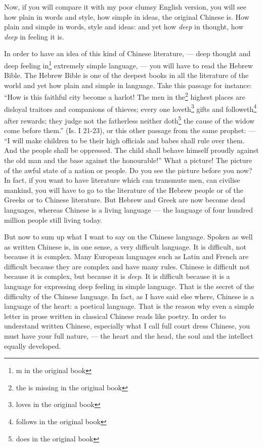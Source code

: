 Now, if you will compare it with my poor clumsy English version, you will see how plain in words and style, how simple in ideas, the original Chinese is.
How plain and simple in words, style and ideas: and yet how \emph{deep} in thought, how \emph{deep} in feeling it is.

In order to have an idea of this kind of Chinese literature, --- deep thought and deep feeling in\footnote{m in the original book} extremely simple language, --- you will have to read the Hebrew Bible. 
The Hebrew Bible is one of the deepest books in all the literature of the world and yet how plain and simple in language.
Take this passage for instance: ``How is this faithful city become a harlot!
The men in the\footnote{the is missing in the original book} highest places are disloyal traitors and companions of thieves;
every one loveth\footnote{loves in the original book} gifts and followeth\footnote{follows in the original book} after rewards;
they judge not the fatherless neither doth\footnote{does in the original book} the cause of the widow come before them.'' 
(Is. I 21-23), or this other passage from the same prophet: --- ``I will make children to be their high officials and babes shall rule over them. And the people shall be oppressed. The child shall behave himself proudly against the old man and the base against the honourable!''
What a picture! The picture of the awful state of a nation or people.
Do you see the picture before you now?
In fact, if you want to have literature which can transmute men, can civilise mankind, you will have to go to the literature of the Hebrew people or of the Greeks or to Chinese literature.
But Hebrew and Greek are now become dead languages, whereas Chinese is a living language --- the language of four hundred million people still living today.

But now to sum up what I want to say on the Chinese language.
Spoken as well as written Chinese is, in one sense, a very difficult language.
It is difficult, not because it is complex.
Many European languages such as Latin and French are difficult because they are complex and have many rules.
Chinese is difficult not because it is complex, but because it is \emph{deep}.
It is difficult because it is a language for expressing deep feeling in simple language.
That is the secret of the difficulty of the Chinese language.
In fact, as I have said else where, Chinese is a language of the heart: a poetical language.
That is the reason why even a simple letter in prose written in classical Chinese reads like poetry.
In order to understand written Chinese, especially what I call full court dress Chinese, you must have your full nature, --- the heart and the head, the soul and the intellect equally developed.

